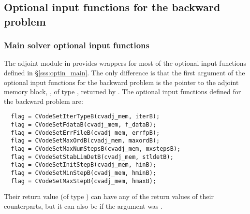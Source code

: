 \subsection{Optional input functions for the backward problem}
\label{ss:optional_input_B}
\subsubsection{Main solver optional input functions}

The adjoint module in {\cvodes} provides wrappers for most of the optional 
input functions defined in \S\ref{sss:optin_main}. The only difference is 
that the first argument of the optional input functions for the backward problem
is the pointer to the adjoint memory block, , of type ,
returned by . 
The optional input functions defined for the backward problem are:
\begin{verbatim}
  flag = CVodeSetIterTypeB(cvadj_mem, iterB);
  flag = CVodeSetFdataB(cvadj_mem, f_dataB);
  flag = CVodeSetErrFileB(cvadj_mem, errfpB);
  flag = CVodeSetMaxOrdB(cvadj_mem, maxordB);
  flag = CVodeSetMaxNumStepsB(cvadj_mem, mxstepsB);
  flag = CVodeSetStabLimDetB(cvadj_mem, stldetB);
  flag = CVodeSetInitStepB(cvadj_mem, hinB);
  flag = CVodeSetMinStepB(cvadj_mem, hminB);
  flag = CVodeSetMaxStepB(cvadj_mem, hmaxB);
\end{verbatim}
Their return value  (of type ) can have any of the return values 
of their counterparts, but it can also be  if the  
argument was .

